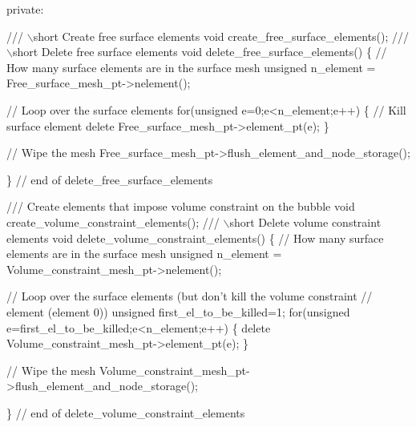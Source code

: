 \begin{DoxyCodeInclude}
\textcolor{keyword}{private}:
 
\textcolor{comment}{}
\textcolor{comment}{ /// \(\backslash\)short Create free surface elements}
\textcolor{comment}{} \textcolor{keywordtype}{void} create\_free\_surface\_elements();
\textcolor{comment}{}
\textcolor{comment}{ /// \(\backslash\)short Delete free surface elements }
\textcolor{comment}{} \textcolor{keywordtype}{void} delete\_free\_surface\_elements()
  \{
   \textcolor{comment}{// How many surface elements are in the surface mesh}
   \textcolor{keywordtype}{unsigned} n\_element = Free\_surface\_mesh\_pt->nelement();
   
   \textcolor{comment}{// Loop over the surface elements}
   \textcolor{keywordflow}{for}(\textcolor{keywordtype}{unsigned} e=0;e<n\_element;e++)
    \{
     \textcolor{comment}{// Kill surface element}
     \textcolor{keyword}{delete} Free\_surface\_mesh\_pt->element\_pt(e);
    \}
   
   \textcolor{comment}{// Wipe the mesh}
   Free\_surface\_mesh\_pt->flush\_element\_and\_node\_storage();
   
  \} \textcolor{comment}{// end of delete\_free\_surface\_elements}
 
\textcolor{comment}{}
\textcolor{comment}{/// Create elements that impose volume constraint on the bubble}
\textcolor{comment}{} \textcolor{keywordtype}{void} create\_volume\_constraint\_elements();
\textcolor{comment}{}
\textcolor{comment}{ /// \(\backslash\)short Delete volume constraint elements}
\textcolor{comment}{} \textcolor{keywordtype}{void} delete\_volume\_constraint\_elements()
  \{
   \textcolor{comment}{// How many surface elements are in the surface mesh}
   \textcolor{keywordtype}{unsigned} n\_element = Volume\_constraint\_mesh\_pt->nelement();
   
   \textcolor{comment}{// Loop over the surface elements (but don't kill the volume constraint}
   \textcolor{comment}{// element (element 0))}
   \textcolor{keywordtype}{unsigned} first\_el\_to\_be\_killed=1;
   \textcolor{keywordflow}{for}(\textcolor{keywordtype}{unsigned} e=first\_el\_to\_be\_killed;e<n\_element;e++) 
    \{
     \textcolor{keyword}{delete} Volume\_constraint\_mesh\_pt->element\_pt(e);
    \}
   
   \textcolor{comment}{// Wipe the mesh}
   Volume\_constraint\_mesh\_pt->flush\_element\_and\_node\_storage();
   
  \} \textcolor{comment}{// end of delete\_volume\_constraint\_elements}

\end{DoxyCodeInclude}


